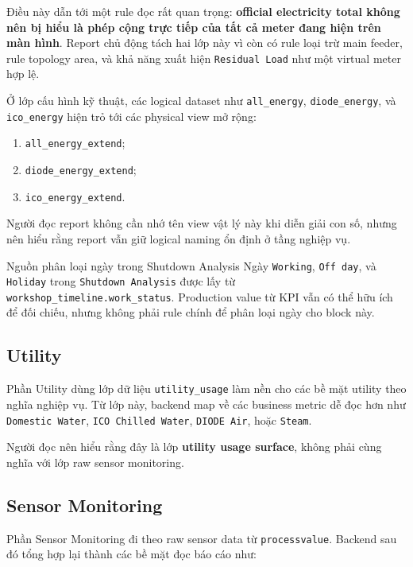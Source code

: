 Điều này dẫn tới một rule đọc rất quan trọng: \textbf{official electricity total không nên bị hiểu là phép cộng trực tiếp của tất cả meter đang hiện trên màn hình}. Report chủ động tách hai lớp này vì còn có rule loại trừ main feeder, rule topology area, và khả năng xuất hiện \texttt{Residual Load} như một virtual meter hợp lệ.

Ở lớp cấu hình kỹ thuật, các logical dataset như \texttt{all\_energy}, \texttt{diode\_energy}, và \texttt{ico\_energy} hiện trỏ tới các physical view mở rộng:

\begin{enumerate}[label=-]
\item \texttt{all\_energy\_extend};
\item \texttt{diode\_energy\_extend};
\item \texttt{ico\_energy\_extend}.
\end{enumerate}

Người đọc report không cần nhớ tên view vật lý này khi diễn giải con số, nhưng nên hiểu rằng report vẫn giữ logical naming ổn định ở tầng nghiệp vụ.

\begin{ReaderNote}{Nguồn phân loại ngày trong Shutdown Analysis}
Ngày \texttt{Working}, \texttt{Off day}, và \texttt{Holiday} trong \texttt{Shutdown Analysis} được lấy từ \texttt{workshop\_timeline.work\_status}. Production value từ KPI vẫn có thể hữu ích để đối chiếu, nhưng không phải rule chính để phân loại ngày cho block này.
\end{ReaderNote}

\subsection{Utility}

Phần Utility dùng lớp dữ liệu \texttt{utility\_usage} làm nền cho các bề mặt utility theo nghĩa nghiệp vụ. Từ lớp này, backend map về các business metric dễ đọc hơn như \texttt{Domestic Water}, \texttt{ICO Chilled Water}, \texttt{DIODE Air}, hoặc \texttt{Steam}.

Người đọc nên hiểu rằng đây là lớp \textbf{utility usage surface}, không phải cùng nghĩa với lớp raw sensor monitoring.

\subsection{Sensor Monitoring}

Phần Sensor Monitoring đi theo raw sensor data từ \texttt{processvalue}. Backend sau đó tổng hợp lại thành các bề mặt đọc báo cáo như:

